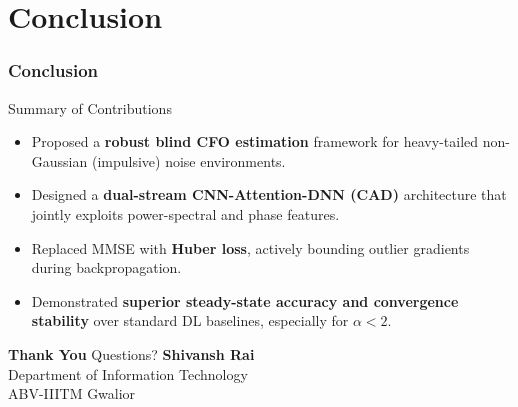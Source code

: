 \documentclass[10pt]{beamer}
\begin{document}
\section{Conclusion}

\begin{frame}
\frametitle{Conclusion}

\begin{block}{Summary of Contributions}
\begin{itemize}
    \item Proposed a \textbf{robust blind CFO estimation} framework for heavy-tailed
          non-Gaussian (impulsive) noise environments.
    \item Designed a \textbf{dual-stream CNN-Attention-DNN (CAD)} architecture that
          jointly exploits power-spectral and phase features.
    \item Replaced MMSE with \textbf{Huber loss}, actively bounding outlier gradients
          during backpropagation.
    \item Demonstrated \textbf{superior steady-state accuracy and convergence stability}
          over standard DL baselines, especially for $\alpha < 2$.
\end{itemize}
\end{block}

\end{frame}

\begin{frame}[plain]
    \centering
    \vfill
    {\Huge \bfseries Thank You}
    \vspace{1.2em}
    \large Questions?
    \vfill
    \normalsize
    \textbf{Shivansh Rai}\\[4pt]
    \footnotesize Department of Information Technology\\
    ABV-IIITM Gwalior
    \vfill
\end{frame}
\end{document}
